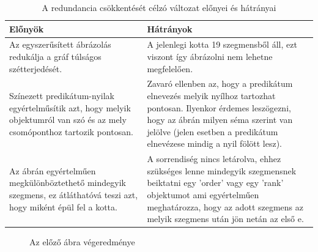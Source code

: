 \begin{table}[h!]
	\caption{A redundancia csökkentését célzó változat előnyei és hátrányai}
	\label{tab:redcomp}
\begin{center}
	\begin{tabular}{ |p{7cm}|p{7cm}| }
		\hline
		Előnyök 
		& 
		Hátrányok
		\\
		\hline
		Az egyszerűsített ábrázolás redukálja a gráf túlságos szétterjedését.
		& 
		A jelenlegi kotta 19 szegmensből áll, ezt viszont így ábrázolni nem lehetne megfelelően.
		\\ 
		\hline
		Színezett predikátum-nyilak egyértelműsítik azt, hogy melyik objektumról van szó és az mely csomóponthoz tartozik pontosan.
		& 
		Zavaró ellenben az, hogy a predikátum elnevezés melyik nyílhoz tartozhat pontosan. Ilyenkor érdemes leszögezni, hogy az ábrán milyen séma szerint van jelölve (jelen esetben a predikátum elnevézese mindig a nyil fölött lesz).
		\\ 
		\hline
		Az ábrán egyértelműen megkülönböztethető mindegyik szegmens, ez átláthatóvá teszi azt, hogy miként épül fel a kotta.
		& 
		A sorrendiség nincs letárolva, ehhez szükséges lenne mindegyik szegmensnek beiktatni egy 'order' vagy egy 'rank' objektumot ami egyértelműen meghatározza, hogy az adott szegmens az melyik szegmens után jön netán az első e.
		\\ 
		\hline
	\end{tabular}
\end{center}
\end{table}

\begin{figure}[h]
	\centering
	\caption{Az előző ábra végeredménye}
	\label{fig:repres2}
\end{figure}


